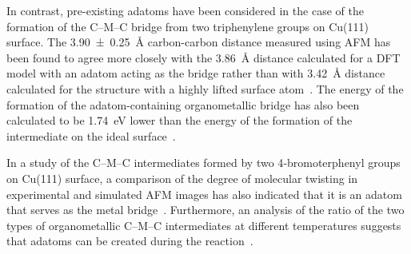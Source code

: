\documentclass[aps,prb,amsmath,amssymb,11pt]{revtex4-1}
\newcommand{\zhzh}{\color{black}}
\renewcommand{\sout}[1]{\unskip}
\begin{document}
{\zhzh In contrast,} pre-existing adatoms have been considered in the case of the formation of the C--M--C bridge from two triphenylene groups on Cu(111) surface. 
The \SI{3.90\pm 0.25}{\angstrom} carbon-carbon distance measured using AFM has been found to agree more closely with the \SI{3.86}{\angstrom} distance calculated for a DFT model with an adatom acting as the bridge rather than with \SI{3.42}{\angstrom} distance calculated for the \sout{model} {\zhzh structure} with a highly lifted \sout{ideal} surface atom~\cite{acsnano2017}. 
\sout{The close agreement between the measured distance and the former model has been interpreted as evidence of the adatom participation in the Ullmann coupling of bromotriphenylene molecules on Cu(111) surface.
The structural analysis has been supported by the analysis of the energetics of the formation of the C--M--C intermediate from two chemisorbed aromatic groups and an adatom that already exist on the surface.} The energy of the formation of the {\zhzh adatom-containing} organometallic bridge has {\zhzh also} been \sout{found} {\zhzh calculated} to be \SI{1.74}{\electronvolt} lower than the energy of the formation of the intermediate on the ideal surface~\cite{acsnano2017}. \sout{However, the reported energy difference is not conclusive because the large amount of energy required to create the adatom has not considered.} %

In \sout{another} {\zhzh a} study {\zhzh of the C--M--C intermediates formed by two 4‐bromoterphenyl groups on Cu(111) surface}, a comparison of the {\zhzh degree of molecular} twisting \sout{angle} in experimental and simulated AFM images \sout{of the C--M--C intermediates formed by two 4‐bromoterphenyl groups on Cu(111) surface} 
has also \sout{confirmed} {\zhzh indicated} that it is an adatom that serves as the metal bridge~\cite{acsnano2019}. Furthermore, an analysis of the {\zhzh  ratio of the two types of organometallic C--M--C intermediates at different temperatures suggests that adatoms can be created during the reaction}\sout{temperature-dependent ratio of the two types of C--M--C intermediates that are observed for this precursor has led to a conclusion that the bridge adatoms are extracted during the C--M--C formation step of the surface Ullmann reaction, not simply present on the surface before the reaction}~\cite{acsnano2019}. 
\end{document}
